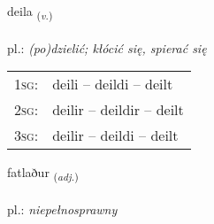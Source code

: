 \documentclass[frontgrid, backgrid]{flacards}\usepackage[]{graphicx}\usepackage[]{xcolor}
\begin{document}
\renewcommand{\blhead}{\vskip5pt {\small\bfseries\footnotesize Sagnorð | Verb }}
\renewcommand{\bcfoot}{\vskip5pt \hspace{2pt}{\small\bfseries\footnotesize 2K}}


{deila \small{\textsubscript{(\textit{v.})}} \\[1ex] %
\textphonetic{[teiːla]} \\
pl.: \emph{(po)dzielić; kłócić się, spierać się} \\  [2ex]
\renewcommand*{\arraystretch}{0.8}
\begin{tabular}{p{1cm}l}
\textsc{1sg}: & deili -- deildi -- deilt \\ 
\textsc{2sg}: & deilir -- deildir -- deilt \\ 
\textsc{3sg}: & deilir -- deildi -- deilt \\ 
\end{tabular}
}

\renewcommand{\flhead}{\vskip5pt \fboxsep=0pt {\small\bfseries\footnotesize Lýsingarorð | Adjective}}
\renewcommand{\fcfoot}{\vskip5pt \fboxsep=0pt \hspace{2pt}{\small\bfseries\footnotesize 2K}}

\renewcommand{\blhead}{\vskip5pt {\small\bfseries\footnotesize Lýsingarorð | Adjective }}
\renewcommand{\bcfoot}{\vskip5pt \hspace{2pt}{\small\bfseries\footnotesize 2K}}


{fatlaður \small{\textsubscript{(\textit{adj.})}} \\[1ex] %
\textphonetic{[fahtlaðʏr]} \\
pl.: \emph{niepełnosprawny} \\  [2ex]
\renewcommand*{\arraystretch}{0.8}
}
\end{document}
